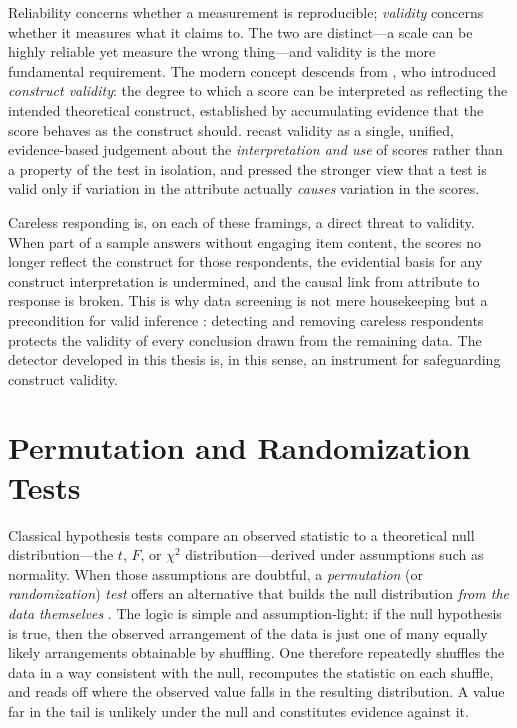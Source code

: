 Reliability concerns whether a measurement is reproducible; \emph{validity}
concerns whether it measures what it claims to. The two are distinct---a scale
can be highly reliable yet measure the wrong thing---and validity is the more
fundamental requirement. The modern concept descends from
\textcite{cronbachmeehl1955construct}, who introduced \emph{construct
validity}: the degree to which a score can be interpreted as reflecting the
intended theoretical construct, established by accumulating evidence that the
score behaves as the construct should. \textcite{messick1995validity} recast
validity as a single, unified, evidence-based judgement about the
\emph{interpretation and use} of scores rather than a property of the test in
isolation, and \textcite{borsboom2004concept} pressed the stronger view that a
test is valid only if variation in the attribute actually \emph{causes}
variation in the scores.

Careless responding is, on each of these framings, a direct threat to validity.
When part of a sample answers without engaging item content, the scores no
longer reflect the construct for those respondents, the evidential basis for any
construct interpretation is undermined, and the causal link from attribute to
response is broken. This is why data screening is not mere housekeeping but a
precondition for valid inference \parencite{desimone2015best}: detecting and
removing careless respondents protects the validity of every conclusion drawn
from the remaining data. The detector developed in this thesis is, in this
sense, an instrument for safeguarding construct validity.

\section{Permutation and Randomization Tests}
\label{sec:perm}

Classical hypothesis tests compare an observed statistic to a theoretical null
distribution---the $t$, $F$, or $\chi^2$ distribution---derived under
assumptions such as normality. When those assumptions are doubtful, a
\emph{permutation} (or \emph{randomization}) \emph{test} offers an alternative
that builds the null distribution \emph{from the data themselves}
\parencite{good2005permutation}. The logic is simple and assumption-light: if
the null hypothesis is true, then the observed arrangement of the data is just
one of many equally likely arrangements obtainable by shuffling. One therefore
repeatedly shuffles the data in a way consistent with the null, recomputes the
statistic on each shuffle, and reads off where the observed value falls in the
resulting distribution. A value far in the tail is unlikely under the null and
constitutes evidence against it.


